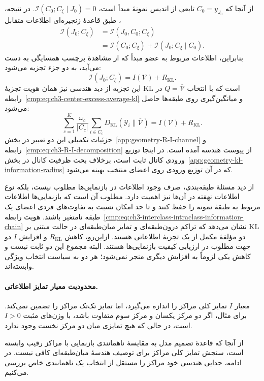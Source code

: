 از آنجا که $C_0=y_{J_0}$ تابعی از اندیس
نمونهٔ مبدأ است، $\mathcal I(C_0;C_\xi\mid J_0)=0$.
در نتیجه، طبق قاعدهٔ زنجیره‌ای اطلاعات
متقابل \cite{CoverThomas2006}،
\[
\begin{aligned}
\mathcal I(J_0;C_\xi)
&=\mathcal I(J_0,C_0;C_\xi)\\
&=\mathcal I(C_0;C_\xi)+\mathcal I(J_0;C_\xi\mid C_0).
\end{aligned}
\]
بنابراین، اطلاعات مربوط به عضو مبدأ که از
مشاهدهٔ برچسب همسایگی به دست می‌آید، به دو
جزء تجزیه می‌شود:
\begin{equation}\label{cmp:eq:ch3-interclass-intraclass-information-chain}
\boxed{
\mathcal I(J_0;C_\xi)=I(\mathcal V)+R_{\mathrm{KL}}.
}
\end{equation}
این تجزیه از دید هندسی نیز همان هویت
تجزیهٔ KL است که با انتخاب
$Q=\overline{\mathcal V}$ در
رابطه~\eqref{cmp:eq:ch3-center-excess-average-kl}
و میانگین‌گیری روی طبقه‌ها حاصل می‌شود:
\[
\sum_{c=1}^{K}\frac{\omega_c}{|C_c|}
\sum_{i\in C_c}
D_{\mathrm{KL}}(\mathscr Y_i\|\overline{\mathcal V})
=I(\mathcal V)+R_{\mathrm{KL}}.
\]
جزئیات تکمیلی این دو تعبیر در
بخش~\ref{app:geometry-R-I-channel}
و رابطه~\eqref{cmp:eq:ch3-R-I-decomposition}
از پیوست هندسه آمده است. در اینجا توزیع ورودی
کانال ثابت است، برخلاف بحث ظرفیت کانال در
بخش~\ref{app:geometry-kl-information-radius}
که در آن توزیع ورودی روی اعضای منتخب بهینه می‌شود.

از دید مسئلهٔ طبقه‌بندی، صرف وجود اطلاعات
در بازنمایی‌ها مطلوب نیست، بلکه نوع اطلاعات
نهفته در آن‌ها نیز اهمیت دارد. مطلوب آن است
که بازنمایی‌ها اطلاعات مربوط به طبقهٔ نمونه را
حفظ کنند و تا حد امکان نسبت به تفاوت‌های
فردی اعضای یک طبقه نامتغیر باشند. هویت
رابطه~\eqref{cmp:eq:ch3-interclass-intraclass-information-chain}
نشان می‌دهد که تراکم درون‌طبقه‌ای و تمایز
میان‌طبقه‌ای در حالت مبتنی بر KL دو مؤلفهٔ
مکمل از یک تجزیهٔ اطلاعاتی هستند. ازاین‌رو،
کاهش $R_{\mathrm{KL}}$ و افزایش $I$ دو
جهت مطلوب در ارزیابی کیفیت بازنمایی‌ها هستند.
البته مجموع این دو ثابت نیست و کاهش یکی
لزوماً به افزایش دیگری منجر نمی‌شود؛ هر دو
به سیاست انتخاب ویژگی وابسته‌اند.

\paragraph{محدودیت معیار تمایز اطلاعاتی.}
معیار $I$ تمایز کلی مراکز را اندازه می‌گیرد،
اما تمایز تک‌تک مراکز را تضمین نمی‌کند. برای
مثال، اگر دو مرکز یکسان و مرکز سوم متفاوت
باشد، با وزن‌های مثبت $I>0$ است، در حالی که
هیچ تمایزی میان دو مرکز نخست وجود ندارد.

از آنجا که قاعدهٔ تصمیم مدل به مقایسهٔ
ناهمانندی بازنمایی با مراکز رقیب وابسته است،
سنجش تمایز کلی مراکز برای توصیف هندسهٔ
میان‌طبقه‌ای کافی نیست. در ادامه، جدایی
هندسی خود مراکز را مستقل از انتخاب یک
ناهمانندی خاص بررسی می‌کنیم.

